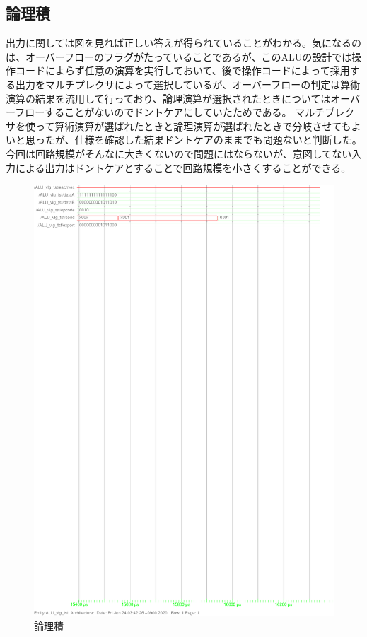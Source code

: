 \documentclass{jsarticle}
\begin{document}
\subsection{論理積}
出力に関しては図を見れば正しい答えが得られていることがわかる。気になるのは、オーバーフローのフラグがたっていることであるが、このALUの設計では操作コードによらず任意の演算を実行しておいて、後で操作コードによって採用する出力をマルチプレクサによって選択しているが、オーバーフローの判定は算術演算の結果を流用して行っており、論理演算が選択されたときについてはオーバーフローすることがないのでドントケアにしていたためである。
マルチプレクサを使って算術演算が選ばれたときと論理演算が選ばれたときで分岐させてもよいと思ったが、仕様を確認した結果ドントケアのままでも問題ないと判断した。
今回は回路規模がそんなに大きくないので問題にはならないが、意図してない入力による出力はドントケアとすることで回路規模を小さくすることができる。
\begin{figure}
    \caption{論理積}
  \includegraphics[scale=0.8]{ALU_and.ps}
\end{figure}
\end{document}

